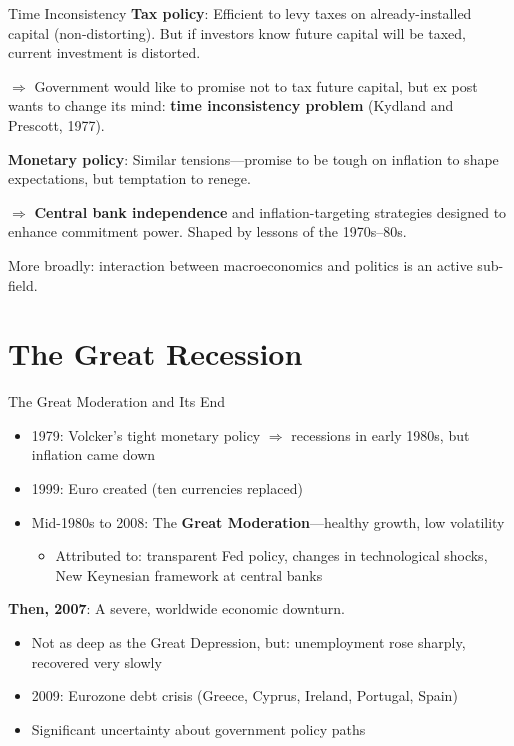\documentclass[blue]{beamer}
\begin{document}
\begin{frame}{Time Inconsistency}
	\textbf{Tax policy}: Efficient to levy taxes on already-installed capital (non-distorting). But if investors know future capital will be taxed, current investment is distorted.
	
	
	$\Rightarrow$ Government would like to promise not to tax future capital, but ex post wants to change its mind: \textbf{time inconsistency problem} (Kydland and Prescott, 1977).
	

	\textbf{Monetary policy}: Similar tensions---promise to be tough on inflation to shape expectations, but temptation to renege.
	

	$\Rightarrow$ \textbf{Central bank independence} and inflation-targeting strategies designed to enhance commitment power. Shaped by lessons of the 1970s--80s.
	
	
	More broadly: interaction between macroeconomics and politics is an active sub-field.
\end{frame}

\section{The Great Recession}

\begin{frame}{The Great Moderation and Its End}
	\begin{itemize}
		\item 1979: Volcker's tight monetary policy $\Rightarrow$ recessions in early 1980s, but inflation came down
		\item 1999: Euro created (ten currencies replaced)
		\item Mid-1980s to 2008: The \textbf{Great Moderation}---healthy growth, low volatility
		\begin{itemize}
			\item Attributed to: transparent Fed policy, changes in technological shocks, New Keynesian framework at central banks
		\end{itemize}
	\end{itemize}
	
	\textbf{Then, 2007}: A severe, worldwide economic downturn.
		\vspace{-6pt}
	\begin{itemize}
		\item Not as deep as the Great Depression, but: unemployment rose sharply, recovered very slowly
		\item 2009: Eurozone debt crisis (Greece, Cyprus, Ireland, Portugal, Spain)
		\item Significant uncertainty about government policy paths
	\end{itemize}
\end{frame}
\end{document}
